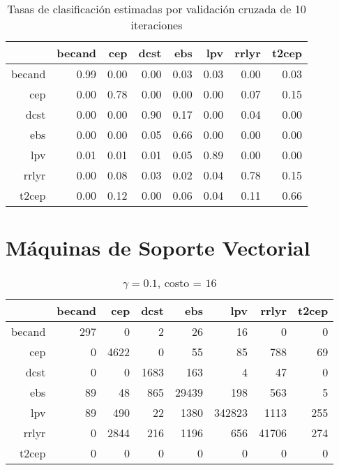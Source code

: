 \documentclass[letterpaper,12pt]{book}
\begin{document}
\begin{table}[ht]
\centering
\begin{tabular}{rrrrrrrr}
  \hline
 & becand & cep & dcst & ebs & lpv & rrlyr & t2cep \\ 
  \hline
becand & 0.99 & 0.00 & 0.00 & 0.03 & 0.03 & 0.00 & 0.03 \\ 
  cep & 0.00 & 0.78 & 0.00 & 0.00 & 0.00 & 0.07 & 0.15 \\ 
  dcst & 0.00 & 0.00 & 0.90 & 0.17 & 0.00 & 0.04 & 0.00 \\ 
  ebs & 0.00 & 0.00 & 0.05 & 0.66 & 0.00 & 0.00 & 0.00 \\ 
  lpv & 0.01 & 0.01 & 0.01 & 0.05 & 0.89 & 0.00 & 0.00 \\ 
  rrlyr & 0.00 & 0.08 & 0.03 & 0.02 & 0.04 & 0.78 & 0.15 \\ 
  t2cep & 0.00 & 0.12 & 0.00 & 0.06 & 0.04 & 0.11 & 0.66 \\ 
   \hline
\end{tabular}
\caption{Tasas de clasificación estimadas por validación cruzada de 10 iteraciones} 
\label{table:cmCvart}
\end{table}

\section{Máquinas de Soporte Vectorial}

\begin{table}[ht]
\centering
\begin{tabular}{rrrrrrrr}
  \hline
 & becand & cep & dcst & ebs & lpv & rrlyr & t2cep \\ 
  \hline
becand & 297 &   0 &   2 &  26 &  16 &   0 &   0 \\ 
  cep &   0 & 4622 &   0 &  55 &  85 & 788 &  69 \\ 
  dcst &   0 &   0 & 1683 & 163 &   4 &  47 &   0 \\ 
  ebs &  89 &  48 & 865 & 29439 & 198 & 563 &   5 \\ 
  lpv &  89 & 490 &  22 & 1380 & 342823 & 1113 & 255 \\ 
  rrlyr &   0 & 2844 & 216 & 1196 & 656 & 41706 & 274 \\ 
  t2cep &   0 &   0 &   0 &   0 &   0 &   0 &   0 \\ 
   \hline
\end{tabular}
\caption{$\gamma = 0.1$, costo = $16$} 
\label{table:cmSvm}
\end{table}
\end{document}
